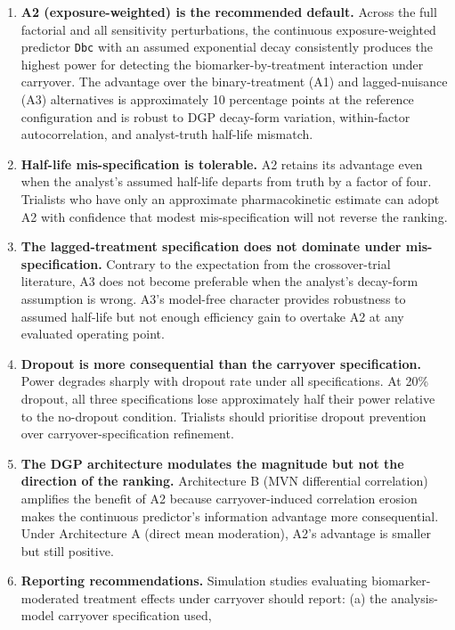 \documentclass[
]{article}
\begin{document}
\begin{enumerate}
\def\labelenumi{\arabic{enumi}.}
\item
  \textbf{A2 (exposure-weighted) is the recommended default.} Across
  the full factorial and all sensitivity perturbations, the
  continuous exposure-weighted predictor \texttt{Dbc} with an assumed
  exponential decay consistently produces the highest power for
  detecting the biomarker-by-treatment interaction under
  carryover. The advantage over the binary-treatment (A1) and
  lagged-nuisance (A3) alternatives is approximately 10
  percentage points at the reference configuration and is
  robust to DGP decay-form variation, within-factor
  autocorrelation, and analyst-truth half-life mismatch.
\item
  \textbf{Half-life mis-specification is tolerable.} A2 retains its
  advantage even when the analyst's assumed half-life departs
  from truth by a factor of four. Trialists who have only an
  approximate pharmacokinetic estimate can adopt A2 with
  confidence that modest mis-specification will not reverse the
  ranking.
\item
  \textbf{The lagged-treatment specification does not dominate under
  mis-specification.} Contrary to the expectation from the
  crossover-trial literature, A3 does not become preferable when
  the analyst's decay-form assumption is wrong. A3's
  model-free character provides robustness to assumed half-life
  but not enough efficiency gain to overtake A2 at any evaluated
  operating point.
\item
  \textbf{Dropout is more consequential than the carryover
  specification.} Power degrades sharply with dropout rate
  under all specifications. At 20\% dropout, all three
  specifications lose approximately half their power relative to
  the no-dropout condition. Trialists should prioritise dropout
  prevention over carryover-specification refinement.
\item
  \textbf{The DGP architecture modulates the magnitude but not the
  direction of the ranking.} Architecture B (MVN differential
  correlation) amplifies the benefit of A2 because
  carryover-induced correlation erosion makes the continuous
  predictor's information advantage more consequential. Under
  Architecture A (direct mean moderation), A2's advantage is
  smaller but still positive.
\item
  \textbf{Reporting recommendations.} Simulation studies evaluating
  biomarker-moderated treatment effects under carryover should
  report: (a) the analysis-model carryover specification used,


\end{enumerate}
\end{document}
